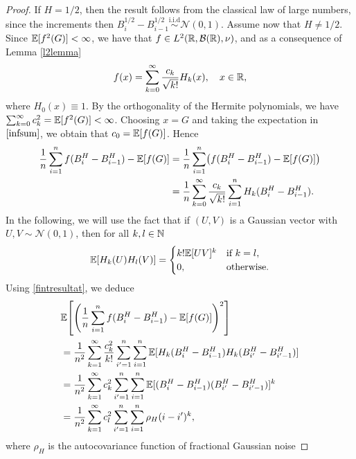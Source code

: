 \begin{proof}
    If $H=1/2$, then the result follows from the classical law of large numbers, since the increments then $B^{1/2}_{i}-B^{1/2}_{i-1}\overset{\textrm{i.i.d}}{\sim} \mathcal{N}(0,1)$. Assume now that $H\neq 1/2$. Since $\mathbb{E}[f^{2}(G)]<\infty$, we have that $f\in L^{2}\left(\R,\mathcal{B}(\R),\nu\right)$, and as a consequence of Lemma \ref{l2lemma}
    \begin{equation}\label{infsum}
        f(x)=\sum_{k=0}^{\infty}\frac{c_{k}}{\sqrt{k!}}H_{k}(x), \quad x\in \mathbb{R},
    \end{equation}
    where $H_{0}(x)\equiv 1$. By the orthogonality of the Hermite polynomials, we have $\sum_{k=0}^{\infty}c_{k}^{2}=\mathbb{E}[f^{2}(G)]<\infty$. Choosing $x=G$ and taking the expectation in $\eqref{infsum}$, we obtain that $c_{0}=\mathbb{E}[f(G)]$. Hence
    \begin{align}
        \frac{1}{n}\sum_{i=1}^{n}f(B_{i}^{H}-B_{i-1}^{H}) - \E[f(G)]&=\frac{1}{n}\sum_{i=1}^{n}\left(f(B_{i}^{H}-B_{i-1}^{H}) - \E[f(G)]\right)\\
        &= \frac{1}{n}\sum_{k=0}^{\infty}\frac{c_{k}}{\sqrt{k!}}\sum_{i=1}^{n}H_{k}(B_{i}^{H}-B_{i-1}^{H}).
    \end{align}
In the following, we will use the fact that if $(U,V)$ is a Gaussian vector with $U,V\sim\mathcal{N}(0,1)$, then for all $k,l\in\mathbb{N}$
\begin{equation}\label{fintresultat}
    \mathbb{E}[H_{k}(U)H_{l}(V)]=\begin{cases}
        k!\mathbb{E}[UV]^{k} & \mathrm{if}\hspace{2.5 pt} k=l,\\
        0, & \mathrm{otherwise}.
    \end{cases}
\end{equation}
Using \eqref{fintresultat}, we deduce
\begin{align}
    &\E\left[\left(\frac{1}{n}\sum_{i=1}^{n}f(B_{i}^{H}-B_{i-1}^{H}) - \E[f(G)]\right)^{2}\right]\\
    &= \frac{1}{n^2}\sum_{k=1}^{\infty}\frac{c_{k}^{2}}{k!}\sum_{i'=1}^{n}\sum_{i =1}^{n}\E[H_{k}(B^{H}_{i}-B_{i-1}^{H})H_{k}(B^{H}_{i'}-B^{H}_{i'-1})]\\
    &= \frac{1}{n^2}\sum_{k=1}^{\infty}c_{k}^{2}\sum_{i'=1}^{n}\sum_{i =1}^{n}\E[(B^{H}_{i}-B_{i-1}^{H})(B^{H}_{i'}-B^{H}_{i'-1})]^{k}\\
    &= \frac{1}{n^2}\sum_{k=1}^{\infty}c_{l}^{2}\sum_{i'=1}^{n}\sum_{i =1}^{n}\rho_{H}(i-i')^{k},
\end{align}
where $\rho_{H}$ is the autocovariance function of fractional Gaussian noise

\end{proof}
